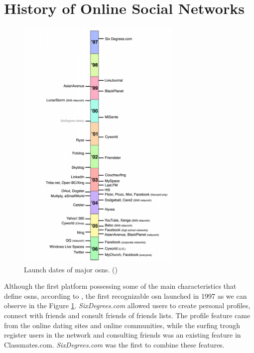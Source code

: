 \section{History of Online Social Networks}
\begin{figure}[h!]
\begin{center}
  \includegraphics[width=0.7\textwidth]{img/timeline.png}
\end{center}
\caption{\label{img:timeline} Launch dates of major \glspl{osn}. (\cite{ellison2007social})}
\end{figure}

Although the first platform possessing some of the main characteristics that define \glspl{osn},
according to \cite{ellison2007social}, the first recognizable \gls{osn} launched in 1997 as we can observe in the Figure \ref{img:timeline}. \textit{SixDegrees.com} allowed users to create personal
profiles, connect with friends and consult friends of friends lists. The profile feature came from the
online dating sites and online communities, while the surfing trough register users in the network
and consulting friends was an existing feature in Classmates.com. \textit{SixDegrees.com} was the first to combine
these features.

